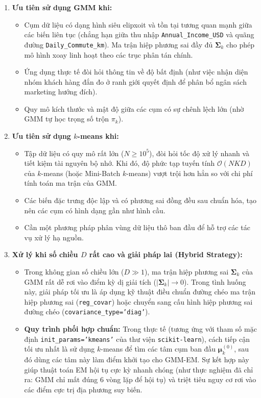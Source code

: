\begin{enumerate}
    \item \textbf{Ưu tiên sử dụng GMM khi:}
    \begin{itemize}
        \item Cụm dữ liệu có dạng hình siêu elipxoit và tồn tại tương quan mạnh giữa các biến liên tục (chẳng hạn giữa thu nhập \texttt{Annual\_Income\_USD} và quãng đường \texttt{Daily\_Commute\_km}). Ma trận hiệp phương sai đầy đủ $\boldsymbol{\Sigma}_k$ cho phép mô hình xoay linh hoạt theo các trục phân tán chính.
        \item Ứng dụng thực tế đòi hỏi thông tin về độ bất định (như việc nhận diện nhóm khách hàng đắn đo ở ranh giới quyết định để phân bổ ngân sách marketing hướng đích).
        \item Quy mô kích thước và mật độ giữa các cụm có sự chênh lệch lớn (nhờ GMM tự học trọng số trộn $\pi_k$).
    \end{itemize}

    \item \textbf{Ưu tiên sử dụng $k$-means khi:}
    \begin{itemize}
        \item Tập dữ liệu có quy mô rất lớn ($N \ge 10^5$), đòi hỏi tốc độ xử lý nhanh và tiết kiệm tài nguyên bộ nhớ. Khi đó, độ phức tạp tuyến tính $\mathcal{O}(NKD)$ của $k$-means (hoặc Mini-Batch $k$-means) vượt trội hơn hẳn so với chi phí tính toán ma trận của GMM.
        \item Các biến đặc trưng độc lập và có phương sai đồng đều sau chuẩn hóa, tạo nên các cụm có hình dạng gần như hình cầu.
        \item Cần một phương pháp phân vùng dữ liệu thô ban đầu để hỗ trợ các tác vụ xử lý hạ nguồn.
    \end{itemize}

    \item \textbf{Xử lý khi số chiều $D$ rất cao và giải pháp lai (Hybrid Strategy):}
    \begin{itemize}
        \item Trong không gian số chiều lớn ($D \gg 1$), ma trận hiệp phương sai $\boldsymbol{\Sigma}_k$ của GMM rất dễ rơi vào điểm kỳ dị giải tích ($|\boldsymbol{\Sigma}_k| \to 0$). Trong tình huống này, giải pháp tối ưu là áp dụng kỹ thuật điều chuẩn đường chéo ma trận hiệp phương sai (\texttt{reg\_covar}) hoặc chuyển sang cấu hình hiệp phương sai đường chéo (\texttt{covariance\_type='diag'}).
        \item \textbf{Quy trình phối hợp chuẩn:} Trong thực tế (tương ứng với tham số mặc định \texttt{init\_params='kmeans'} của thư viện \texttt{scikit-learn}), cách tiếp cận tối ưu nhất là sử dụng $k$-means để tìm các tâm cụm ban đầu $\boldsymbol{\mu}_k^{(0)}$, sau đó dùng các tâm này làm điểm khởi tạo cho GMM-EM. Sự kết hợp này giúp thuật toán EM hội tụ cực kỳ nhanh chóng (như thực nghiệm đã chỉ ra: GMM chỉ mất đúng $6$ vòng lặp để hội tụ) và triệt tiêu nguy cơ rơi vào các điểm cực trị địa phương suy biến.
    \end{itemize}
\end{enumerate}

